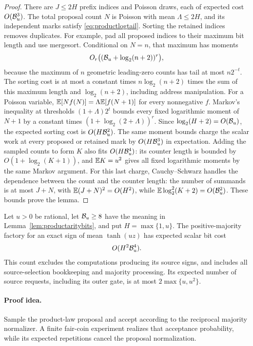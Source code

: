 \begin{proof}
There are $J\le2H$ prefix indices and Poisson draws, each of
expected cost $O(\mathcal B_u^3)$. The total proposal count $N$ is
Poisson with mean $\Lambda\le2H$, and its independent marks
satisfy \eqref{eq:productlogtail}.
Sorting the retained indices removes duplicates. For example,
pad all proposed indices to their maximum bit length and use
mergesort. Conditional on $N=n$, that maximum has moments
\[
 O_r\bigl((\mathcal B_u+\log_2(n+2))^r\bigr),
\]
because the maximum of $n$ geometric leading-zero counts has
tail at most $n2^{-t}$.
The sorting cost is at most a constant times
$n\log_2(n+2)$ times the sum of this maximum length and
$\log_2(n+2)$, including address manipulation.
For a Poisson variable,
$\mathbb E[Nf(N)]=\Lambda\mathbb E[f(N+1)]$ for every nonnegative $f$.
Markov's inequality at thresholds
$(1+\Lambda)2^t$ bounds every fixed logarithmic moment of
$N+1$ by a constant times
$(1+\log_2(2+\Lambda))^r$.
Since $\log_2(H+2)=O(\mathcal B_u)$, the expected sorting cost is
$O(H\mathcal B_u^2)$. The same moment bounds charge the scalar
work at every proposed or retained mark by
$O(H\mathcal B_u^3)$ in expectation. Adding the sampled counts to
form $K$ also fits $O(H\mathcal B_u^4)$: its counter length is
bounded by $O(1+\log_2(K+1))$, and $\mathbb E K=u^2$ gives all
fixed logarithmic moments by the same Markov argument.
For this last charge, Cauchy--Schwarz handles the dependence
between the count and the counter length: the number of
summands is at most $J+N$, with
$\mathbb E(J+N)^2=O(H^2)$, while
$\mathbb E\log_2^2(K+2)=O(\mathcal B_u^2)$.
These bounds prove the lemma.
\end{proof}

\begin{theorem}
\label{thm:quadraticradiusbits}
Let $u>0$ be rational, let $\mathcal B_u\ge8$ have the meaning in
Lemma~\ref{lem:productaritybits}, and put $H=\max\{1,u\}$.
The positive-majority factory for an exact sign of mean
$\tanh(uz)$ has expected scalar bit cost
\[
 O(H^2\mathcal B_u^4).
\]
This count excludes the computations producing its source
signs, and includes all source-selection bookkeeping and
majority processing. Its expected number of source requests,
including its outer gate, is at most $2\max\{u,u^2\}$.
\end{theorem}
\paragraph{Proof idea.}
Sample the product-law proposal and accept according to the reciprocal
majority normalizer. A finite fair-coin experiment realizes that acceptance
probability, while its expected repetitions cancel the proposal
normalization.


